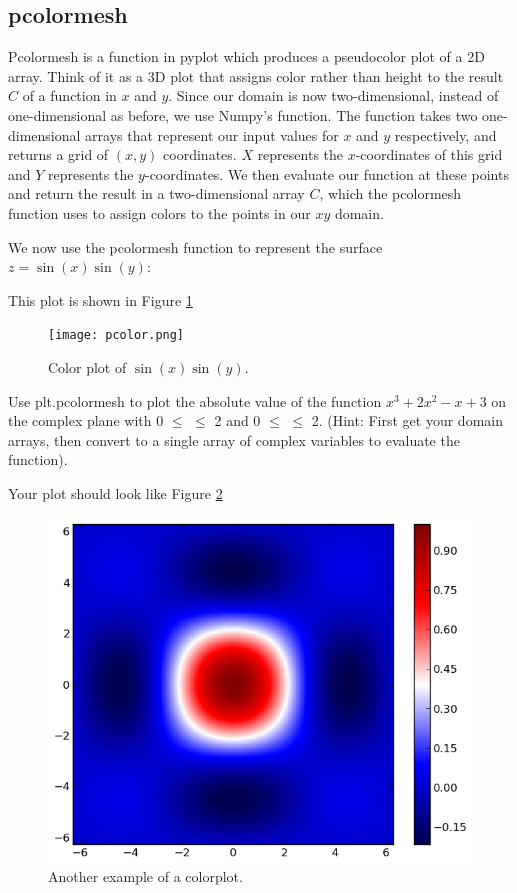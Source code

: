 \subsection*{pcolormesh}
Pcolormesh is a function in pyplot which produces a pseudocolor plot of a 2D array. Think of it as a 3D plot that assigns color rather than height to the result $C$ of a function in $x$ and $y$. Since our domain is now two-dimensional, instead of one-dimensional as before, we use Numpy's  function. The  function takes two one-dimensional arrays that represent our input values for $x$ and $y$ respectively, and returns a grid of $(x, y)$ coordinates. $X$ represents the $x$-coordinates of this grid and $Y$ represents the $y$-coordinates. We then evaluate our function at these points and return the result in a two-dimensional array $C$, which the pcolormesh function uses to assign colors to the points in our $xy$ domain.

We now use the pcolormesh function to represent 
the surface $z=\sin(x)\sin(y)$:


 
This plot is shown in Figure \ref{mpl:pcmexample}

\begin{figure} 
\texttt{[image: pcolor.png]}
\caption{Color plot of $\sin\left(x\right)\sin\left(y\right)$.}
\label{mpl:pcmexample} 
\end{figure}

\begin{problem} Use plt.pcolormesh to plot the absolute value of the function $x^3 +2x^2 -x +3$ on the complex plane with 0 $\leq$  $\leq$ 2 and 0 $\leq$  $\leq$ 2.  (Hint: First get your domain arrays, then convert to a single array of complex variables to evaluate the function).

Your plot should look like Figure \ref{mpl:pcolormesh} 
\end{problem}


\begin{figure} 
\includegraphics[width=\textwidth]{pcolor2.png}
\caption{Another example of a colorplot.} 
\label{mpl:pcolormesh}
\end{figure}


